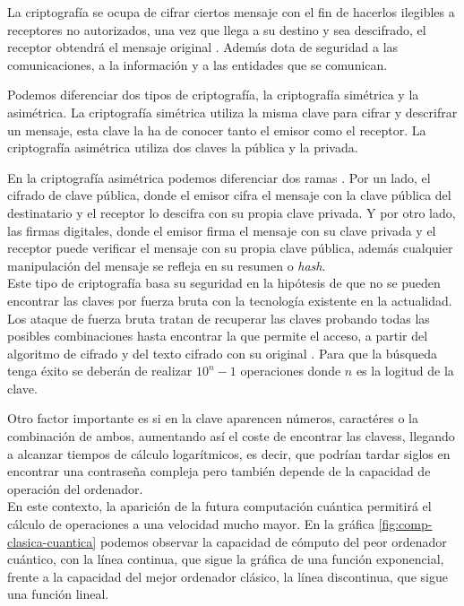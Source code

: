 La criptografía se ocupa de cifrar ciertos mensaje con el fin de hacerlos ilegibles a receptores no autorizados, una vez que llega a su destino y sea descifrado, el receptor obtendrá el mensaje original \cite{criptografia}. Además dota de seguridad a las comunicaciones, a la información y a las entidades que se comunican.

Podemos diferenciar dos tipos de criptografía, la criptografía simétrica y la asimétrica. La criptografía simétrica utiliza la misma clave para cifrar y descrifrar un mensaje, esta clave la ha de conocer tanto el emisor como el receptor. La criptografía asimétrica utiliza dos claves la pública y la privada.

En la criptografía asimétrica podemos diferenciar dos ramas \cite{criptografia-asimetrica}. Por un lado, el cifrado de clave pública, donde el emisor cifra el mensaje con la clave pública del destinatario y el receptor lo descifra con su propia clave privada. Y por otro lado, las firmas digitales, donde el emisor firma el mensaje con su clave privada y el receptor puede verificar el mensaje con su propia clave pública, además cualquier manipulación del mensaje se refleja en su resumen o \textit{hash}.\\

Este tipo de criptografía basa su seguridad en la hipótesis de que no se pueden encontrar las claves por fuerza bruta con la tecnología existente en la actualidad. Los ataque de fuerza bruta tratan de recuperar las claves probando todas las posibles combinaciones hasta encontrar la que permite el acceso, a partir del algoritmo de cifrado y del texto cifrado con su original \cite{fuerza-bruta}. Para que la búsqueda tenga éxito se deberán de realizar $10^n-1$ operaciones donde $n$ es la logitud de la clave. 

Otro factor importante es si en la clave aparencen números, caractéres o la combinación de ambos, aumentando así el coste de encontrar las clavess, llegando a alcanzar tiempos de cálculo logarítmicos, es decir, que podrían tardar siglos en encontrar una contraseña compleja pero también depende de la capacidad de operación del ordenador.\\

En este contexto, la aparición de la futura computación cuántica permitirá el cálculo de operaciones a una velocidad mucho mayor. En la gráfica \ref{fig:comp-clasica-cuantica} podemos observar la capacidad de cómputo del peor ordenador cuántico, con la línea continua, que sigue la gráfica de una función exponencial, frente a la capacidad del mejor ordenador clásico, la línea discontinua, que sigue una función lineal.

